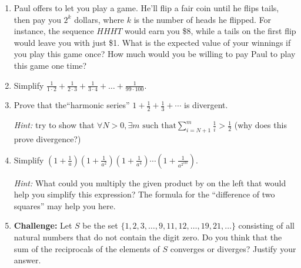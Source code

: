 \documentclass[12pt]{article}
\begin{document}
\begin{enumerate}

\item Paul offers to let you play a game.  He'll flip a fair coin until he flips tails, then pay you $2^k$ dollars, where $k$ is the number of heads he flipped.  For instance, the sequence $HHHT$ would earn you \$8, while a tails on the first flip would leave you with just \$1.  What is the expected value of your winnings if you play this game once?  How much would you be willing to pay Paul to play this game one time?

\item Simplify $\frac{1}{1 \cdot 2} + \frac{1}{2 \cdot 3} + \frac{1}{3 \cdot 4} + \ldots + \frac{1}{99 \cdot 100}$.

\item Prove that the``harmonic series'' $1 + \frac{1}{2} + \frac{1}{3} + \cdots$ is divergent.

\emph{Hint:}  try to show that $\forall N > 0, \exists m\text { such that} \sum_{i=N+1}^m \frac{1}{i} > \frac{1}{2}$ (why does this prove divergence?)

\item Simplify $\left(1 + \frac{1}{a}\right)\left(1 + \frac{1}{a^2}\right)\left(1 + \frac{1}{a^4}\right) \cdots \left(1 + \frac{1}{a^{2^{100}}}\right)$.

\emph{Hint:}  What could you multiply the given product by on the left that would help you simplify this expression?  The formula for the ``difference of two squares'' may help you here.

\item \textbf{Challenge:}  Let $S$ be the set $\{1, 2, 3, \ldots, 9, 11, 12, \ldots, 19, 21, \ldots\}$ consisting of all natural numbers that do not contain the digit zero.
Do you think that the sum of the reciprocals of the elements of $S$ converges or diverges?  Justify your answer.



\end{enumerate}
\end{document}

